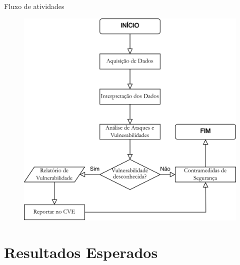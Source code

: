 \documentclass{uspBeamer}
\begin{document}
    \begin{frame}{Fluxo de atividades}
        \begin{figure}
            \includegraphics[height=.83\textheight]{fluxograma.png}
        \end{figure}
    \end{frame}

    \section{Resultados Esperados}
\end{document}
